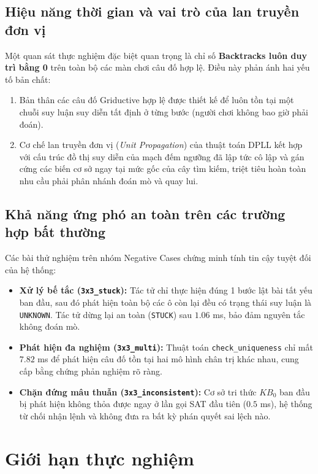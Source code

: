 \subsection{Hiệu năng thời gian và vai trò của lan truyền đơn vị}
Một quan sát thực nghiệm đặc biệt quan trọng là chỉ số \textbf{Backtracks luôn duy trì bằng 0} trên toàn bộ các màn chơi câu đố hợp lệ. Điều này phản ánh hai yếu tố bản chất:
\begin{enumerate}
    \item Bản thân các câu đố Griductive hợp lệ được thiết kế để luôn tồn tại một chuỗi suy luận suy diễn tất định ở từng bước (người chơi không bao giờ phải đoán).
    \item Cơ chế lan truyền đơn vị (\textit{Unit Propagation}) của thuật toán DPLL kết hợp với cấu trúc đồ thị suy diễn của mạch đếm ngưỡng đã lập tức cô lập và gán cứng các biến cơ sở ngay tại mức gốc của cây tìm kiếm, triệt tiêu hoàn toàn nhu cầu phải phân nhánh đoán mò và quay lui.
\end{enumerate}

\subsection{Khả năng ứng phó an toàn trên các trường hợp bất thường}
Các bài thử nghiệm trên nhóm Negative Cases chứng minh tính tin cậy tuyệt đối của hệ thống:
\begin{itemize}
    \item \textbf{Xử lý bế tắc (\texttt{3x3\_stuck}):} Tác tử chỉ thực hiện đúng 1 bước lật bài tất yếu ban đầu, sau đó phát hiện toàn bộ các ô còn lại đều có trạng thái suy luận là \texttt{UNKNOWN}. Tác tử dừng lại an toàn (\texttt{STUCK}) sau $1.06$ ms, bảo đảm nguyên tắc không đoán mò.
    \item \textbf{Phát hiện đa nghiệm (\texttt{3x3\_multi}):} Thuật toán \texttt{check\_uniqueness} chỉ mất $7.82$ ms để phát hiện câu đố tồn tại hai mô hình chân trị khác nhau, cung cấp bằng chứng phản nghiệm rõ ràng.
    \item \textbf{Chặn đứng mâu thuẫn (\texttt{3x3\_inconsistent}):} Cơ sở tri thức $KB_0$ ban đầu bị phát hiện không thỏa được ngay ở lần gọi SAT đầu tiên ($0.5$ ms), hệ thống từ chối nhận lệnh và không đưa ra bất kỳ phán quyết sai lệch nào.
\end{itemize}

\section{Giới hạn thực nghiệm}
\label{sec:gioi-han-thuc-nghiem}

